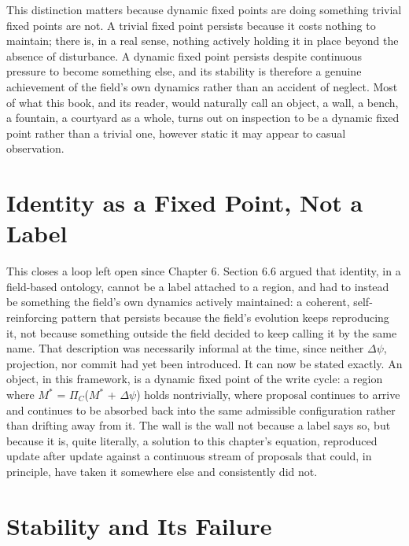 This distinction matters because dynamic fixed points are doing something trivial fixed points are not. A trivial fixed point persists because it costs nothing to maintain; there is, in a real sense, nothing actively holding it in place beyond the absence of disturbance. A dynamic fixed point persists despite continuous pressure to become something else, and its stability is therefore a genuine achievement of the field's own dynamics rather than an accident of neglect. Most of what this book, and its reader, would naturally call an object, a wall, a bench, a fountain, a courtyard as a whole, turns out on inspection to be a dynamic fixed point rather than a trivial one, however static it may appear to casual observation.

\section{Identity as a Fixed Point, Not a Label}

This closes a loop left open since Chapter 6. Section 6.6 argued that identity, in a field-based ontology, cannot be a label attached to a region, and had to instead be something the field's own dynamics actively maintained: a coherent, self-reinforcing pattern that persists because the field's evolution keeps reproducing it, not because something outside the field decided to keep calling it by the same name. That description was necessarily informal at the time, since neither \(\Delta\psi\), projection, nor commit had yet been introduced. It can now be stated exactly. An object, in this framework, is a dynamic fixed point of the write cycle: a region where \(M^*\) = \(\Pi_C\)(\(M^*\) + \(\Delta\psi\)) holds nontrivially, where proposal continues to arrive and continues to be absorbed back into the same admissible configuration rather than drifting away from it. The wall is the wall not because a label says so, but because it is, quite literally, a solution to this chapter's equation, reproduced update after update against a continuous stream of proposals that could, in principle, have taken it somewhere else and consistently did not.

\section{Stability and Its Failure}

